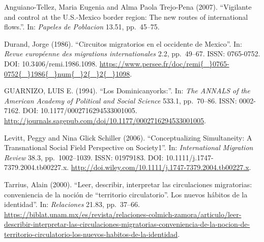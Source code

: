 \documentclass[11pt,]{article}
\begin{document}
Anguiano-Tellez, Maria Eugenia and Alma Paola Trejo-Pena (2007).
``Vigilante and control at the U.S.-Mexico border region: The new routes
of international flows.''. In: \emph{Papeles de Poblacion} 13.51,
pp.~45--75.

Durand, Jorge (1986). ``Circuitos migratorios en el occidente de
Mexico''. In: \emph{Revue européenne des migrations internationales}
2.2, pp.~49--67. ISSN: 0765-0752. DOI: 10.3406/remi.1986.1098.
\url{https://www.persee.fr/doc/remi{\_}0765-0752{\_}1986{\_}num{\_}2{\_}2{\_}1098}.

GUARNIZO, LUIS E. (1994). ``Los Dominicanyorks:''. In:
\emph{The ANNALS of the American Academy of Political and Social Science}
533.1, pp.~70--86. ISSN: 0002-7162. DOI: 10.1177/0002716294533001005.
\url{http://journals.sagepub.com/doi/10.1177/0002716294533001005}.

Levitt, Peggy and Nina Glick Schiller (2006). ``Conceptualizing
Simultaneity: A Transnational Social Field Perspective on Society1''.
In: \emph{International Migration Review} 38.3, pp.~1002--1039. ISSN:
01979183. DOI: 10.1111/j.1747-7379.2004.tb00227.x.
\url{http://doi.wiley.com/10.1111/j.1747-7379.2004.tb00227.x}.

Tarrius, Alain (2000). ``Leer, describir, interpretar las circulaciones
migratorias: conveniencia de la noción de ``territorio circulatorio''.
Los nuevos hábitos de la identidad''. In: \emph{Relaciones} 21.83,
pp.~37--66.
\url{https://biblat.unam.mx/es/revista/relaciones-colmich-zamora/articulo/leer-describir-interpretar-las-circulaciones-migratorias-conveniencia-de-la-nocion-de-territorio-circulatorio-los-nuevos-habitos-de-la-identidad}.
\end{document}
